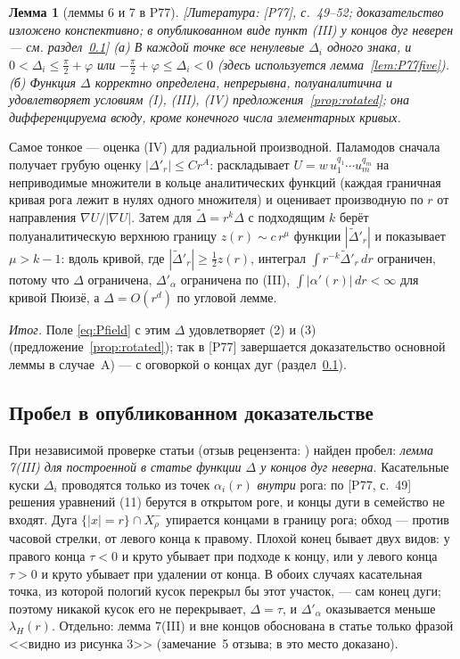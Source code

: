 \documentclass[11pt,a4paper]{article}
\newtheorem{lemma}[theorem]{Лемма}
\theoremstyle{definition}
\newcommand{\mk}[1]{\textsf{[#1]}}
\begin{document}
\begin{lemma}[леммы 6 и 7 в P77]\label{lem:P77seven}
\mk{Литература: [P77], с.~49--52; доказательство изложено конспективно; в опубликованном виде
пункт (III) у концов дуг неверен --- см. раздел~\ref{subsec:gap}} (а) В каждой точке все
ненулевые $\Delta_i$ одного знака, и $0<\Delta_i\le\frac\pi2+\varphi$ или $-\frac\pi2+\varphi\le\Delta_i<0$
(здесь используется лемма~\ref{lem:P77five}). (б) Функция $\Delta$ корректно определена,
непрерывна, полуаналитична и удовлетворяет условиям (I), (III), (IV) предложения~\ref{prop:rotated};
она дифференцируема всюду, кроме конечного числа элементарных кривых.
\end{lemma}

Самое тонкое --- оценка (IV) для радиальной производной. Паламодов сначала получает грубую
оценку $|\Delta'_r|\le Cr^A$: раскладывает $U=w\,u_1^{q_1}\cdots u_m^{q_m}$ на неприводимые
множители в кольце аналитических функций (каждая граничная кривая рога лежит в нулях одного
множителя) и оценивает производную по $r$ от направления $\nabla U/|\nabla U|$. Затем для
$\tilde\Delta=r^k\Delta$ с подходящим $k$ берёт полуаналитическую верхнюю границу
$z(r)\sim c\,r^\mu$ функции $|\tilde\Delta'_r|$ и показывает $\mu>k-1$: вдоль кривой, где
$|\tilde\Delta'_r|\ge\frac12z(r)$, интеграл $\int r^{-k}\tilde\Delta'_r\,dr$ ограничен, потому что
$\Delta$ ограничена, $\Delta'_\alpha$ ограничена по (III), $\int|\alpha'(r)|\,dr<\infty$ для кривой Пюизё, а
$\Delta=O(r^d)$ по угловой лемме.

\emph{Итог.} Поле \eqref{eq:Pfield} с этим $\Delta$ удовлетворяет (2) и (3)
(предложение~\ref{prop:rotated}); так в [P77] завершается доказательство основной леммы в
случае~A) --- с оговоркой о концах дуг (раздел~\ref{subsec:gap}).

\subsection{Пробел в опубликованном доказательстве}\label{subsec:gap}

При независимой проверке статьи (отзыв рецензента:
) найден пробел: \emph{лемма 7(III) для
построенной в статье функции $\Delta$ у концов дуг неверна}. Касательные куски $\Delta_i$
проводятся только из точек $\alpha_i(r)$ \emph{внутри} рога: по [P77, с.~49] решения уравнений (11)
берутся в открытом роге, и концы дуги в семейство не входят. Дуга $\{|x|=r\}\cap X^-_\rho$
упирается концами в границу рога; обход --- против часовой стрелки, от левого конца к правому.
Плохой конец бывает двух видов: у правого конца $\tau<0$ и круто убывает при подходе к концу, или
у левого конца $\tau>0$ и круто убывает при удалении от конца. В обоих случаях касательная точка,
из которой пологий кусок перекрыл бы этот участок, --- сам конец дуги; поэтому никакой кусок его
не перекрывает, $\Delta=\tau$, и $\Delta'_\alpha$ оказывается меньше $\lambda_H(r)$. Отдельно:
лемма 7(III) и вне концов обоснована в статье только фразой <<видно из рисунка 3>> (замечание~5
отзыва; в  это место доказано).
\end{document}
